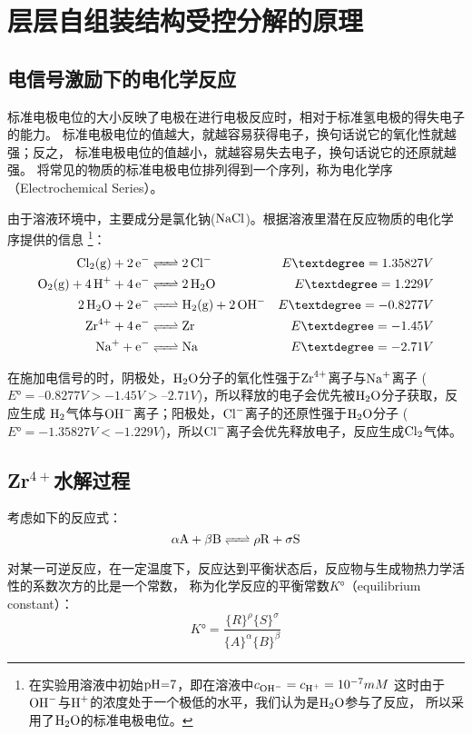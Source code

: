 \section{层层自组装结构受控分解的原理}
\subsection{电信号激励下的电化学反应}
标准电极电位的大小反映了电极在进行电极反应时，相对于标准氢电极的得失电子的能力。
标准电极电位的值越大，就越容易获得电子，换句话说它的氧化性就越强；反之，
标准电极电位的值越小，就越容易失去电子，换句话说它的还原就越强\cite{Trasatti1980}。
将常见的物质的标准电极电位排列得到一个序列，称为电化学序（Electrochemical Series）。

由于溶液环境中，主要成分是氯化钠($\ce{NaCl}$)。根据溶液里潜在反应物质的电化学序提供的信息\cite{Weik2001}
\footnote{在实验用溶液中初始$\ce{pH=7}$，即在溶液中$c_{\ce{OH-}}=c_{\ce{H+}}=10^{-7}mM$
这时由于$\ce{OH-}$与$\ce{H+}$的浓度处于一个极低的水平，我们认为是$\ce{H2O}$参与了反应，
所以采用了$\ce{H2O}$的标准电极电位。}：
\begin{align}
\label{equation:anode_reaction} \ce{Cl2(g) + 2e- &<=> 2 Cl-} \quad\quad\quad\quad &{E°}=1.35827V \\
\ce{O2(g) + 4H+ + 4 e- &<=> 2H2O} &{E°}=1.229V \\ 
\label{equation:cathode_reaction} \ce{2 H2O + 2 e- &<=> H2(g) + 2OH- } &{E°}=-0.8277V \\
\ce{Zr^4+ + 4e- &<=> Zr}   &{E°}=-1.45V \\
\ce{Na+ + e- &<=> Na }     &{E°}=-2.71V
\end{align}


在施加电信号的时，阴极处，$\ce{H2O}$分子的氧化性强于$\ce{Zr^4+}$离子与$\ce{Na+}$离子
($E°=–0.8277V>-1.45V>–2.71V$)，所以释放的电子会优先被$\ce{H2O}$分子获取，反应生成
$\ce{H2}$气体与$\ce{OH-}$离子；阳极处，$\ce{Cl-}$离子的还原性强于$\ce{H2O}$分子
($E°=-1.35827V<-1.229V$)，所以$\ce{Cl-}$离子会优先释放电子，反应生成$\ce{Cl2}$气体。

\subsection{Zr$^{4+}$水解过程}
考虑如下的反应式：
\begin{equation}
    \ce{\alpha{A} +\beta{B} <=> \rho{R} + \sigma{S}}
\end{equation}

对某一可逆反应，在一定温度下，反应达到平衡状态后，反应物与生成物热力学活性的系数次方的比是一个常数，
称为化学反应的平衡常数$K°$（equilibrium constant）：
\begin{equation}
    K°=\frac{\{R\}^\rho \{S\}^\sigma}{\{A\}^\alpha \{B\}^\beta}
\end{equation}

